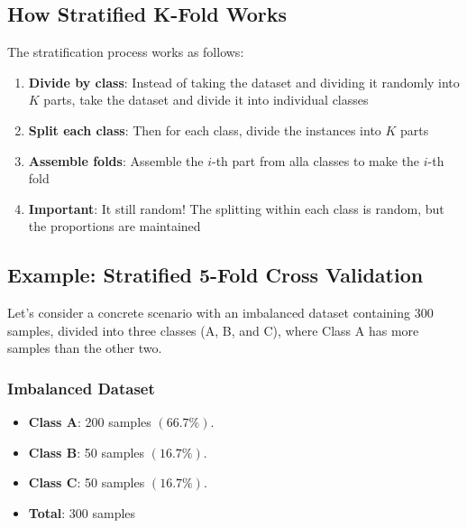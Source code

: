 \documentclass[a4paper]{article}
\theoremstyle{definition}
\begin{document}
\subsection{How Stratified K-Fold Works}
The stratification process works as follows:
\begin{enumerate}
    \item \textbf{Divide by class}: Instead of taking the dataset and dividing it randomly into \( K \) parts, take the dataset and divide it into individual classes 
    \item \textbf{Split each class}: Then for each class, divide the instances into \( K \) parts 
    \item \textbf{Assemble folds}: Assemble the \( i \)-th part from alla classes to make the \( i \)-th fold 
    \item \textbf{Important}: It still random! The splitting within each class is random, but the proportions are maintained
\end{enumerate}
\subsection{Example: Stratified 5-Fold Cross Validation}
Let's consider a concrete scenario with an imbalanced dataset containing 300 samples, divided into three classes 
(A, B, and C), where Class A has more samples than the other two.
\subsubsection{Imbalanced Dataset}
\begin{itemize}
    \item \textbf{Class A}: 200 samples \( (66.7\%) \).
    \item \textbf{Class B}: 50 samples \( (16.7\%) \).
    \item \textbf{Class C}: 50 samples \( (16.7\%) \).
    \item \textbf{Total}: 300 samples
\end{itemize}
\end{document}
